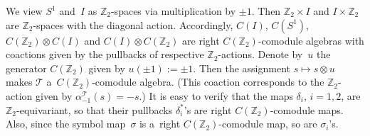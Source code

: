 \documentclass[pdftex]{sigma}
\begin{document}
We view $S^1$ and~$I$ as ${\mathbb Z_2}$-spaces via multiplication by $\pm 1$.
Then ${\mathbb Z_2}\times I$ and $I\times {\mathbb Z_2}$ are ${\mathbb Z_2}$-spaces with the diagonal action.
Accordingly, $C(I)$, $C(S^1)$, $C({\mathbb Z_2})\otimes C(I)$ and $C(I)\otimes C({\mathbb Z_2})$ are right $C({\mathbb
Z_2})$-comodule algebras with coactions given by the pullbacks of respective ${\mathbb Z_2}$-actions.
Denote by~$u$ the generator $C({\mathbb Z_2})$ given by $u(\pm 1):=\pm 1$.
Then the assignment $s\mapsto s\otimes u$ makes ${\mathcal{T}}$ a~$C({\mathbb Z_2})$-comodule algebra.
(This coaction corresponds to the ${\mathbb Z_2}$-action given by $\alpha_{-1}^{\mathcal{T}}(s)=-s$.) It is easy to
verify that the maps $\delta_i$, $i=1,2$, are ${\mathbb Z_2}$-equivariant, so that their pullbacks $\delta^*_i$'s are
right $C({\mathbb Z_2})$-comodule maps.
Also, since the symbol map~$\sigma$ is a~right $C({\mathbb Z_2})$-comodule map, so are $\sigma_i$'s.
\end{document}
